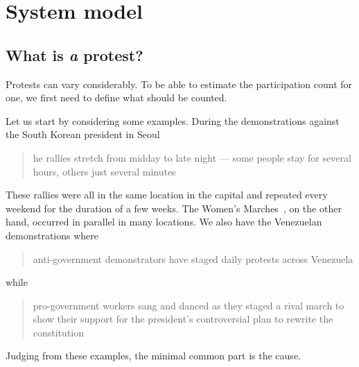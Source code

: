 \mode*

\section{System model}%
\label{SystemModel}

\subsection{What is \protect\emph{a} protest?}%
\label{WhatIsAProtest}

Protests can vary considerably.
To be able to estimate the participation count for one, we first need to define
what should be counted.

Let us start by considering some examples.
During the demonstrations against the South Korean president in Seoul
\blockcquote{2016DemonstrationsInSeoul}{%
  he rallies stretch from midday to late night --- some 
  people stay for several hours, others just several minutes%
}.
These rallies were all in the same location in the capital and repeated every 
weekend for the duration of a few weeks.
The Women's Marches~\cite{2017WomensMarchesInUS}, on the other hand, occurred 
in parallel in many locations.
We also have the Venezuelan demonstrations where
\blockcquote{2017VenezuelaProtestFrequency}{%
  anti-government demonstrators have staged daily protests across Venezuela%
} while
\blockcquote{AlJazeeraOnVenezuela2017}{%
  pro-government workers sang and danced as they staged a rival march to show 
  their support for the president's controversial plan to rewrite the 
  constitution%
}.
Judging from these examples, the minimal common part is the cause.%
\label{CauseIsTheCommonDenominator}


